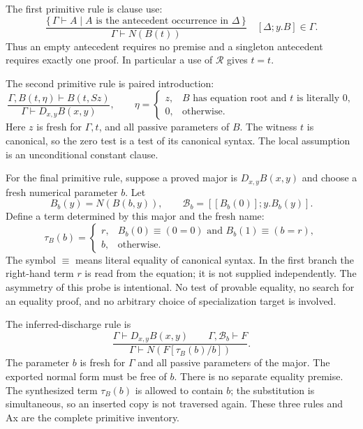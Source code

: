 The first primitive rule is clause use:
\[
 \frac{\{\,\Gamma\vdash A\mid A\text{ is the antecedent occurrence in }
                                  \Delta\,\}}
      {\Gamma\vdash N(B(t))}
 \quad [\Delta;y.B]\in\Gamma.
 \tag{U}
\]
Thus an empty antecedent requires no premise and a singleton antecedent
requires exactly one proof. In particular a use of $\mathcal R$ gives $t=t$.

The second primitive rule is paired introduction:
\[
 \frac{\Gamma,B(t,\eta)\vdash B(t,Sz)}
      {\Gamma\vdash D_{x,y}B(x,y)},\qquad
 \eta=\begin{cases}
 z,&B\text{ has equation root and }t\text{ is literally }0,\\
 0,&\text{otherwise}.
 \end{cases}
 \tag{I}
\]
Here $z$ is fresh for $\Gamma,t$, and all passive parameters of $B$.
The witness $t$ is canonical, so the zero test is a test of its canonical
syntax. The local assumption is an unconditional constant clause.

For the final primitive rule, suppose a proved major is $D_{x,y}B(x,y)$
and choose a fresh numerical parameter $b$. Let
\[
 B_b(y)=N(B(b,y)),\qquad
 \mathcal B_b=[[B_b(0)];y.B_b(y)].
\]
Define a term determined by this major and the fresh name:
\[
 \tau_B(b)=
 \begin{cases}
 r,&B_b(0)\equiv(0=0)\text{ and }B_b(1)\equiv(b=r),\\
 b,&\text{otherwise}.
 \end{cases}
 \tag{P}
\]
The symbol $\equiv$ means literal equality of canonical syntax. In the
first branch the right-hand term $r$ is read from the equation; it is not
supplied independently. The asymmetry of this probe is intentional. No test
of provable equality, no search for an equality proof, and no arbitrary
choice of specialization target is involved.

The inferred-discharge rule is
\[
 \frac{\Gamma\vdash D_{x,y}B(x,y)\qquad
       \Gamma,\mathcal B_b\vdash F}
      {\Gamma\vdash N(F[\tau_B(b)/b])}.
 \tag{E$^*$}
\]
The parameter $b$ is fresh for $\Gamma$ and all passive parameters of the
major. The exported normal form must be free of $b$. There is no separate
equality premise. The synthesized term $\tau_B(b)$ is allowed to contain
$b$; the substitution is simultaneous, so an inserted copy is not traversed
again. These three rules and Ax are the complete primitive inventory.

